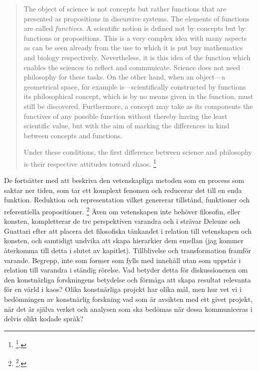 \documentclass[11pt]{article}
\begin{document}
\begin{quote}
The object of science is not concepts but rather functions that are
presented as propositions in discursive systems. The elements of
functions are called \emph{functives}. A scientific notion is defined not
by concepts but by functions or propositions. This is a very complex
idea with many aspects as can be seen already from the use to which it
is put buy mathematics and biology respectively. Nevertheless, it is
this idea of the function which enables the sciences to reflect and
communicate. Science does not need philosophy for these tasks. On the
other hand, when an object---a geometrical space, for example
is---scientifically constructed by functions its philosophical
concept, which is by no means given in the function, must still be
discovered. Furthermore, a concept may take as its components the
functives of any possible function without thereby having the least
scientific value, but with the aim of marking the differences in kind
between concepts and functions.

Under these conditions, the first difference between science and
philosophy is their respective attitudes toward chaos. \footnote{\footcite[s.117-8]{deleuze1994}.}
\end{quote}

De fortsätter med att beskriva den vetenskapliga metoden som en process
som saktar ner tiden, som tar ett komplext fenomen och reducerar det
till en enda funktion. Reduktion och representation vilket genererar
tillstånd, funktioner och referentiella propositioner. \footnote{\footcite[s.197]{deleuze1994}.} Även om
vetenskapen inte behöver filosofin, eller konsten, kompletterar de tre
perspektiven varandra och i strävar Deleuze och Guattari efter att
placera det filosofiska tänkandet i relation till vetenskapen och
konsten, och samtidigt undvika att skapa hierarkier dem emellan (jag
kommer återkomma till detta i slutet av kapitlet). Tillblivelse och
transformation framför varande. Begrepp, inte som former som fylls med
innehåll utan som uppstår i relation till varandra i ständig rörelse.
Vad betyder detta för diskussionenen om den konstnärliga forskningens
betydelse och förmåga att skapa resultat relevanta för en värld i kaos?
Olika konstnärliga projekt har olika mål, men hur vet vi i bedömningen
av konstnärlig forskning vad som är avsikten med ett givet projekt, när
det är själva verket och analysen som ska bedömas när dessa kommuniceras
i delvis olikt kodade språk?
\end{document}
